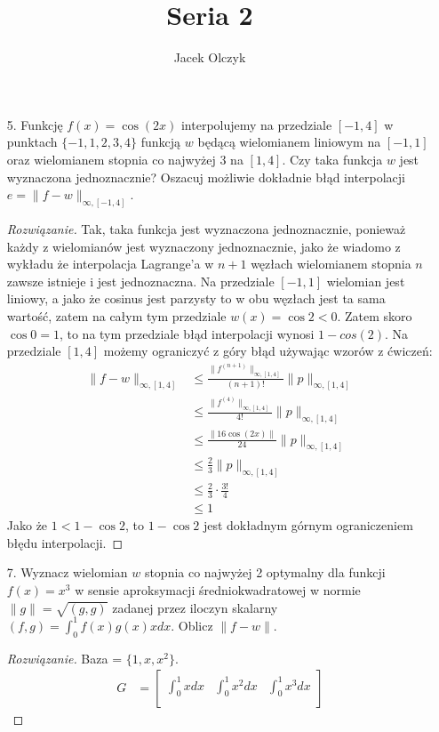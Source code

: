 \documentclass{article}
\title{Seria 2}
\author{Jacek Olczyk}
\begin{document}
\maketitle
\begin{enumerate}
\item[5.] Funkcję $f(x)=\cos(2x)$ interpolujemy na przedziale $[-1,4]$ w punktach $ \{-1, 1, 2, 3, 4\} $ funkcją $ w $ będącą wielomianem liniowym na $ [-1,1] $ oraz wielomianem stopnia co najwyżej 3 na $ [1,4] $. Czy taka funkcja $ w $ jest wyznaczona jednoznacznie? Oszacuj możliwie dokładnie błąd interpolacji $ e=\|f-w\|_{\infty, [-1, 4]} $.

\begin{proof}[Rozwiązanie]
Tak, taka funkcja jest wyznaczona jednoznacznie, ponieważ każdy z wielomianów jest wyznaczony jednoznacznie, jako że wiadomo z wykładu że interpolacja Lagrange'a w $ n + 1 $ węzłach wielomianem stopnia $ n $ zawsze istnieje i jest jednoznaczna. Na przedziale $ [-1,1] $ wielomian jest liniowy, a jako że cosinus jest parzysty to w obu węzłach jest ta sama wartość, zatem na całym tym przedziale $ w(x)=\cos2<0 $. Zatem skoro $ \cos0=1 $, to na tym przedziale błąd interpolacji wynosi $ 1 - cos(2) $. Na przedziale $ [1,4] $ możemy ograniczyć z góry błąd używając wzorów z ćwiczeń: 
\begin{align*}
\|f-w\|_{\infty, [1,4]} &\le 
\frac{
	\|f^{(n+1)}\|_{\infty,[1,4]}
}{
	(n+1)!
} \|p\|_{\infty,[1,4]}\\
&\le \frac{
	\|f^{(4)}\|_{\infty,[1,4]}
}{
	4!
} \|p\|_{\infty,[1,4]}\\
&\le\frac{ \|16\cos(2x)\|}{24}\|p\|_{\infty,[1,4]}\\
&\le \frac{2}{3}\|p\|_{\infty,[1,4]}\\
&\le \frac{2}{3} \cdot \frac{3!}{4}\\
&\le 1 
\end{align*}
Jako że $ 1 < 1 - \cos2 $, to $ 1 - \cos2 $ jest dokładnym górnym ograniczeniem błędu interpolacji.
\end{proof}
\newpage
\item [7.] Wyznacz wielomian $ w $ stopnia co najwyżej 2 optymalny dla funkcji $ f(x)=x^3 $ w sensie aproksymacji średniokwadratowej w normie $ \|g\|=\sqrt{(g, g)} $ zadanej przez iloczyn skalarny $ (f, g)=\int_{0}^{1}f(x)g(x)xdx $. Oblicz $ \|f-w\| $.
\begin{proof}[Rozwiązanie]
	Baza = $ \{1, x, x^2\} $.
	\begin{align*}
		G&=
		\begin{bmatrix}
		\int_{0}^{1}xdx & \int_{0}^{1}x^2dx & \int_{0}^{1}x^3dx\\

\end{bmatrix}
\end{align*}
\end{proof}
\end{enumerate}
\end{document}
